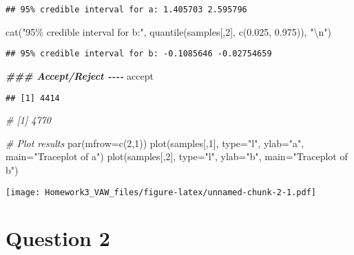 \documentclass[
]{article}
\newenvironment{Shaded}{\begin{snugshade}}{\end{snugshade}}
\newcommand{\AttributeTok}[1]{\textcolor[rgb]{0.77,0.63,0.00}{#1}}
\newcommand{\CommentTok}[1]{\textcolor[rgb]{0.56,0.35,0.01}{\textit{#1}}}
\newcommand{\DecValTok}[1]{\textcolor[rgb]{0.00,0.00,0.81}{#1}}
\newcommand{\DocumentationTok}[1]{\textcolor[rgb]{0.56,0.35,0.01}{\textbf{\textit{#1}}}}
\newcommand{\FloatTok}[1]{\textcolor[rgb]{0.00,0.00,0.81}{#1}}
\newcommand{\FunctionTok}[1]{\textcolor[rgb]{0.00,0.00,0.00}{#1}}
\newcommand{\NormalTok}[1]{#1}
\newcommand{\SpecialCharTok}[1]{\textcolor[rgb]{0.00,0.00,0.00}{#1}}
\newcommand{\StringTok}[1]{\textcolor[rgb]{0.31,0.60,0.02}{#1}}
\begin{document}
\begin{verbatim}
## 95% credible interval for a: 1.405703 2.595796
\end{verbatim}

\begin{Shaded}
\begin{Highlighting}[]
\FunctionTok{cat}\NormalTok{(}\StringTok{"95\% credible interval for b:"}\NormalTok{, }\FunctionTok{quantile}\NormalTok{(samples[,}\DecValTok{2}\NormalTok{], }\FunctionTok{c}\NormalTok{(}\FloatTok{0.025}\NormalTok{, }\FloatTok{0.975}\NormalTok{)), }\StringTok{"}\SpecialCharTok{\textbackslash{}n}\StringTok{"}\NormalTok{)}
\end{Highlighting}
\end{Shaded}

\begin{verbatim}
## 95% credible interval for b: -0.1085646 -0.02754659
\end{verbatim}

\begin{Shaded}
\begin{Highlighting}[]
\DocumentationTok{\#\#\# Accept/Reject {-}{-}{-}{-}}
\NormalTok{accept}
\end{Highlighting}
\end{Shaded}

\begin{verbatim}
## [1] 4414
\end{verbatim}

\begin{Shaded}
\begin{Highlighting}[]
\CommentTok{\# [1] 4770}

\CommentTok{\# Plot results}
\FunctionTok{par}\NormalTok{(}\AttributeTok{mfrow=}\FunctionTok{c}\NormalTok{(}\DecValTok{2}\NormalTok{,}\DecValTok{1}\NormalTok{))}
\FunctionTok{plot}\NormalTok{(samples[,}\DecValTok{1}\NormalTok{], }\AttributeTok{type=}\StringTok{"l"}\NormalTok{, }\AttributeTok{ylab=}\StringTok{"a"}\NormalTok{, }\AttributeTok{main=}\StringTok{"Traceplot of a"}\NormalTok{)}
\FunctionTok{plot}\NormalTok{(samples[,}\DecValTok{2}\NormalTok{], }\AttributeTok{type=}\StringTok{"l"}\NormalTok{, }\AttributeTok{ylab=}\StringTok{"b"}\NormalTok{, }\AttributeTok{main=}\StringTok{"Traceplot of b"}\NormalTok{)}
\end{Highlighting}
\end{Shaded}

\texttt{[image: Homework3\_VAW\_files/figure-latex/unnamed-chunk-2-1.pdf]}

\hypertarget{question-2}{%
\section{Question 2}\label{question-2}}
\end{document}
